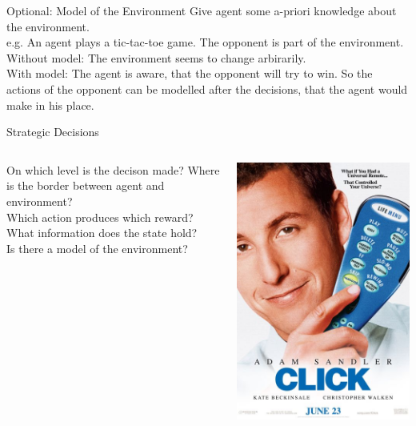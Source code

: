 \documentclass{beamer}
\begin{document}

\begin{frame}{Optional: Model of the Environment}
	Give agent some a-priori knowledge about the environment. \\[\baselineskip] 
	e.g. An agent plays a tic-tac-toe game. The opponent is part of the environment.\\[\baselineskip]
	Without model: The environment seems to change arbirarily.\\[\baselineskip]
	With model: The agent is aware, that the opponent will try to win. So the actions of the opponent can be modelled after the decisions, that the agent would make in his place. \\[\baselineskip]
\end{frame}


\begin{frame}{Strategic Decisions}
	\begin{columns}
	On which level is the decison made? Where is the border between agent and environment? \\
	Which action produces which reward? \\
	What information does the state hold? \\
	Is there a model of the environment?
		
			\includegraphics[width=0.8\linewidth]{Images/click.jpg}
	\end{columns}
\end{frame}
\end{document}
